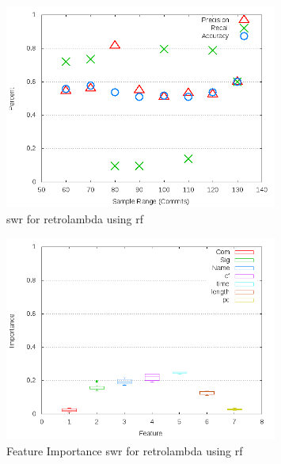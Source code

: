 \begin{figure}[!t]
\centering
\includegraphics[width=0.8\textwidth]{images/rf/test_1/retrolambda_sample_range.png}
\caption{\gls{swr} for retrolambda using \gls{rf}}
\label{fig:test_1_retrolambda_rf}
\end{figure}

\begin{figure}[!t]
\centering
\includegraphics[width=0.8\textwidth]{images/rf/test_1/retrolambda_importance.png}
\caption{Feature Importance \gls{swr} for retrolambda using \gls{rf}}
\label{fig:test_1_retrolambda_rf_importance}
\end{figure}

